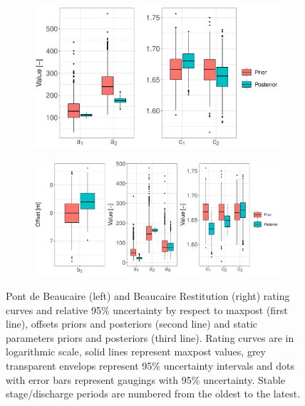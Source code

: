 \documentclass[11pt]{article}
\begin{document}
\begin{figure}[h!]
        \begin{subfigure}{0.47\textwidth}
            \centering
            \includegraphics[width=\linewidth]{Figs/7e-a&csPt.pdf}
            \caption{}
            \label{subfig:a's and c's Pt}
        \end{subfigure}
        \begin{subfigure}{0.51\textwidth}
            \centering
            \includegraphics[width=\linewidth]{Figs/7f-b3_as_cs_Restit.pdf}
            \caption{}
            \label{subfig:bac'sRes}
        \end{subfigure}
        \caption{Pont de Beaucaire (left) and Beaucaire Restitution (right) rating curves and relative 95\% uncertainty by respect to maxpost (first line), offsets priors and posteriors (second line) and static parameters priors and posteriors (third line). Rating curves are in logarithmic scale, solid lines represent maxpost values, grey transparent envelops represent 95\% uncertainty intervals and dots with error bars represent gaugings with 95\% uncertainty. Stable stage/discharge periods are numbered from the oldest to the latest.}
        \label{fig:RcsAndParams}
    \end{figure}
    
\end{document}
